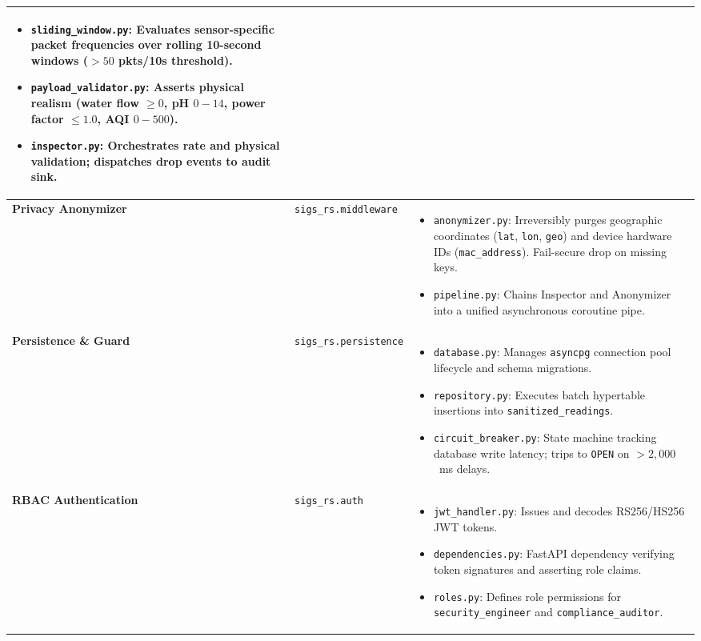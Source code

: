 \begin{table}[H]
\begin{tabularx}{\linewidth}{@{}p{3.2cm} p{3.5cm} X@{}}
\begin{itemize}[leftmargin=*,noitemsep,topsep=0pt]
    \item \texttt{sliding\_window.py}: Evaluates sensor-specific packet frequencies over rolling 10-second windows ($> 50$ pkts/10s threshold).
    \item \texttt{payload\_validator.py}: Asserts physical realism (water flow $\ge 0$, pH $0-14$, power factor $\le 1.0$, AQI $0-500$).
    \item \texttt{inspector.py}: Orchestrates rate and physical validation; dispatches drop events to audit sink.
\end{itemize} \\
\midrule
\textbf{Privacy Anonymizer} & \texttt{sigs\_rs.middleware} & 
\begin{itemize}[leftmargin=*,noitemsep,topsep=0pt]
    \item \texttt{anonymizer.py}: Irreversibly purges geographic coordinates (\texttt{lat}, \texttt{lon}, \texttt{geo}) and device hardware IDs (\texttt{mac\_address}). Fail-secure drop on missing keys.
    \item \texttt{pipeline.py}: Chains Inspector and Anonymizer into a unified asynchronous coroutine pipe.
\end{itemize} \\
\midrule
\textbf{Persistence \& Guard} & \texttt{sigs\_rs.persistence} & 
\begin{itemize}[leftmargin=*,noitemsep,topsep=0pt]
    \item \texttt{database.py}: Manages \texttt{asyncpg} connection pool lifecycle and schema migrations.
    \item \texttt{repository.py}: Executes batch hypertable insertions into \texttt{sanitized\_readings}.
    \item \texttt{circuit\_breaker.py}: State machine tracking database write latency; trips to \texttt{OPEN} on $> 2,000$~ms delays.
\end{itemize} \\
\midrule
\textbf{RBAC Authentication} & \texttt{sigs\_rs.auth} & 
\begin{itemize}[leftmargin=*,noitemsep,topsep=0pt]
    \item \texttt{jwt\_handler.py}: Issues and decodes RS256/HS256 JWT tokens.
    \item \texttt{dependencies.py}: FastAPI dependency verifying token signatures and asserting role claims.
    \item \texttt{roles.py}: Defines role permissions for \texttt{security\_engineer} and \texttt{compliance\_auditor}.
\end{itemize} \\

\end{tabularx}
\end{table}
